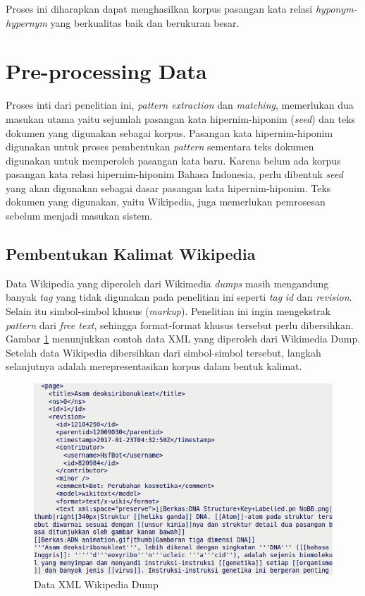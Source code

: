 \noindent Proses ini diharapkan dapat menghasilkan korpus pasangan kata relasi \textit{hyponym-hypernym} yang berkualitas baik dan berukuran besar.


\section{Pre-processing Data}
Proses inti dari penelitian ini, \textit{pattern extraction} dan \textit{matching}, memerlukan dua masukan utama yaitu sejumlah pasangan kata hipernim-hiponim (\textit{seed}) dan teks dokumen yang digunakan sebagai korpus. Pasangan kata hipernim-hiponim digunakan untuk proses pembentukan \textit{pattern} sementara teks dokumen digunakan untuk memperoleh pasangan kata baru. Karena belum ada korpus pasangan kata relasi hipernim-hiponim Bahasa Indonesia, perlu dibentuk \textit{seed} yang akan digunakan sebagai dasar pasangan kata hipernim-hiponim. Teks dokumen yang digunakan, yaitu Wikipedia, juga memerlukan pemrosesan sebelum menjadi masukan sistem.

\subsection{Pembentukan Kalimat Wikipedia}
Data Wikipedia yang diperoleh dari Wikimedia \textit{dumps} masih mengandung banyak \textit{tag} yang tidak digunakan pada penelitian ini seperti \textit{tag} \textit{id} dan \textit{revision}. Selain itu simbol-simbol khusus (\textit{markup}). Penelitian ini ingin mengekstrak \textit{pattern} dari \textit{free text}, sehingga format-format khusus tersebut perlu dibersihkan. Gambar \ref{fig:wiki-dump} menunjukkan contoh data XML yang diperoleh dari Wikimedia Dump. Setelah data Wikipedia dibersihkan dari simbol-simbol tersebut, langkah selanjutnya adalah merepresentasikan korpus dalam bentuk kalimat. 

\begin{figure}
    \centering
    \includegraphics[width=\linewidth]{pics/WikipediaDump}
    \caption{Data XML Wikipedia Dump}
    \label{fig:wiki-dump}
\end{figure}

